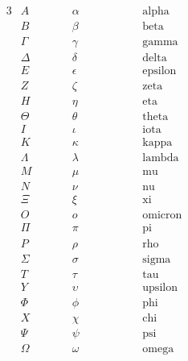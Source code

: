 \vfill

\begin{alignat*}{3}
&A&\qquad&\alpha&\qquad\qquad&\text{alpha}\\
&B&&\beta&&\text{beta}\\ 
&\Gamma&&\gamma&&\text{gamma}\\
&\Delta&&\delta&&\text{delta}\\
&E&&\epsilon&&\text{epsilon}\\
&Z&&\zeta&&\text{zeta}\\
&H&&\eta&&\text{eta}\\
&\Theta&&\theta&&\text{theta}\\
&I&&\iota&&\text{iota}\\
&K&&\kappa&&\text{kappa}\\
&\Lambda&&\lambda&&\text{lambda}\\
&M&&\mu&&\text{mu}\\
&N&&\nu&&\text{nu}\\
&\Xi&&\xi&&\text{xi}\\
&O&&o&&\text{omicron}\\
&\Pi&&\pi&&\text{pi}\\
&P&&\rho&&\text{rho}\\
&\Sigma&&\sigma&&\text{sigma}\\
&T&&\tau&&\text{tau}\\
&Y&&\upsilon&&\text{upsilon}\\
&\Phi&&\phi&&\text{phi}\\
&X&&\chi&&\text{chi}\\
&\Psi&&\psi&&\text{psi}\\
&\Omega&&\omega&&\text{omega}
\end{alignat*}
\vfill\eject
